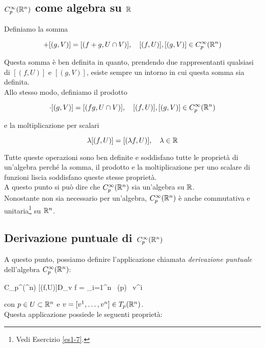\subsection{$ C_{p}^{\infty}(\mathbb{R}^{n}) $ come algebra su $ \mathbb{R} $}

Definiamo la somma

\begin{equation}
	[(f,U)] + [(g,V)] = [(f + g,U \cap V)] \qcomma [(f,U)], [(g,V)] \in C_{p}^{\infty}(\R^{n})
\end{equation}

Questa somma è ben definita in quanto, prendendo due rappresentanti qualsiasi di $ [(f,U)] $ e $ [(g,V)] $, esiste sempre un intorno in cui questa somma sia definita.\\
Allo stesso modo, definiamo il prodotto

\begin{equation}
	[(f,U)] \cdot [(g,V)] = [(f g,U \cap V)] \qcomma [(f,U)], [(g,V)] \in C_{p}^{\infty}(\R^{n})
\end{equation}

e la moltiplicazione per scalari

\begin{equation}
	\lambda [(f,U)] = [(\lambda f,U)] \qcomma \lambda \in \R
\end{equation}

Tutte queste operazioni sono ben definite e soddisfano tutte le proprietà di un'algebra perché la somma, il prodotto e la moltiplicazione per uno scalare di funzioni liscia soddisfano queste stesse proprietà.\\
A questo punto si può dire che $ C_{p}^{\infty}(\mathbb{R}^{n}) $ sia un'algebra su $ \mathbb{R} $.\\
Nonostante non sia necessario per un'algebra, $ C_{p}^{\infty}(\mathbb{R}^{n}) $ è anche commutativa e unitaria\footnote{%
	Vedi Esercizio \ref{es1-7}.%
} su $ \mathbb{R}^{n} $.

\subsection{Derivazione puntuale di $ C_{p}^{\infty}(\mathbb{R}^{n}) $}

A questo punto, possiamo definire l'applicazione chiamata \textit{derivazione puntuale} dell'algebra $ C_{p}^{\infty}(\mathbb{R}^{n}) $:

	{C_{p}^{\infty}(\R^{n})}{\R}
	{[(f,U)]}{D_{v} f = \sum_{i=1}^{n}  \, (p) \, v^{i}}

con $ p \in U \subset \mathbb{R}^{n} $ e $ v = [v^{1}, \dots, v^{n}] \in T_{p} (\mathbb{R}^{n}) $.\\
Questa applicazione possiede le seguenti proprietà:

